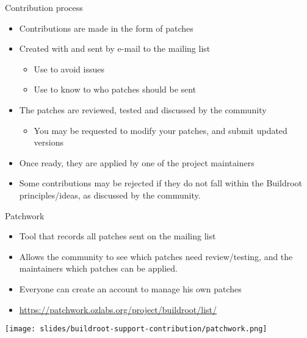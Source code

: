 \begin{frame}{Contribution process}
  \begin{itemize}
  \item Contributions are made in the form of patches
  \item Created with  and sent by e-mail to the mailing list
    \begin{itemize}
    \item Use  to avoid issues
    \item Use  to know to who patches should be
      sent
    \end{itemize}
  \item The patches are reviewed, tested and discussed by the
    community
    \begin{itemize}
    \item You may be requested to modify your patches, and submit
      updated versions
    \end{itemize}
  \item Once ready, they are applied by one of the project maintainers
  \item Some contributions may be rejected if they do not fall within
    the Buildroot principles/ideas, as discussed by the community.
  \end{itemize}
\end{frame}

\begin{frame}{Patchwork}
  \begin{itemize}
  \item Tool that records all patches sent on the mailing list
  \item Allows the community to see which patches need review/testing,
    and the maintainers which patches can be applied.
  \item Everyone can create an account to manage his own patches
  \item \url{https://patchwork.ozlabs.org/project/buildroot/list/}
  \end{itemize}

  \begin{center}
    \texttt{[image: slides/buildroot-support-contribution/patchwork.png]}
  \end{center}
\end{frame}

